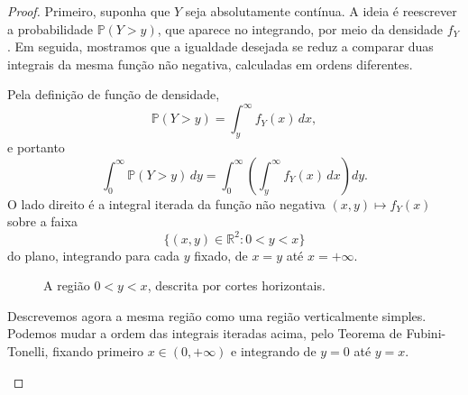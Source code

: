 \documentclass[12pt,portuguese]{article}
\theoremstyle{definition}
\theoremstyle{plainexercise}
\theoremstyle{starredexercise}
\theoremstyle{definition}
\begin{document}
\begin{proof}
Primeiro, suponha que $Y$ seja absolutamente contínua. A ideia é
reescrever a probabilidade $\mathbb{P}(Y > y)$, que
aparece no integrando, por meio da densidade $f_Y$. Em seguida, mostramos que a igualdade
desejada se reduz a comparar duas integrais da mesma função não negativa,
calculadas em ordens diferentes. 

Pela definição de função de densidade,
\[
\mathbb{P}(Y > y) = \int_{y}^{\infty} f_Y(x)\,dx,
\]
e portanto
\begin{equation}\label{eq:cauda-integral-dupla}
\int_{0}^{\infty} \mathbb{P}(Y > y)\,dy
= \int_{0}^{\infty} \left(\int_{y}^{\infty} f_Y(x)\,dx\right)dy.
\end{equation}
O lado direito é a integral iterada da função não negativa 
$(x, y) \longmapsto f_Y(x)$ sobre a faixa
\[
\{(x, y) \in \mathbb{R}^2 : 0 < y < x\}
\]
do plano, integrando para cada $y$ fixado, de $x=y$ até $x=+\infty$. 
\begin{figure}[H]
\centering
{}
\caption{A região $0<y<x$, descrita por cortes horizontais.}
\label{fig:regiao-formula-cauda}
\end{figure}
Descrevemos agora a mesma região como uma região verticalmente simples.
Podemos mudar a ordem das integrais iteradas acima, 
pelo Teorema de Fubini-Tonelli, 
fixando primeiro $x\in (0,+\infty)$ e integrando de $y=0$ até $y=x$.
\begin{figure}[H]
\centering
{}
\end{figure}
\end{proof}
\end{document}
